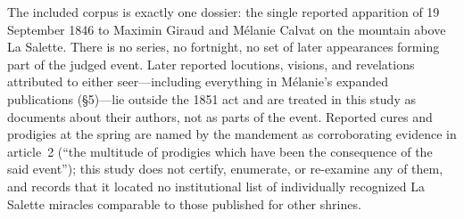 The included corpus is exactly one dossier: the single reported
apparition of 19 September 1846 to Maximin Giraud and Mélanie
Calvat on the mountain above La Salette. There is no series, no
fortnight, no set of later appearances forming part of the judged
event. Later reported locutions, visions, and revelations attributed
to either seer---including everything in Mélanie's expanded
publications (\S5)---lie outside the 1851 act and are treated in
this study as documents about their authors, not as parts of the
event. Reported cures and prodigies at the spring are named by the
mandement as corroborating evidence in article~2 (``the multitude of
prodigies which have been the consequence of the said event''); this
study does not certify, enumerate, or re-examine any of them, and
records that it located no institutional list of individually
recognized La Salette miracles comparable to those published for
other shrines.
